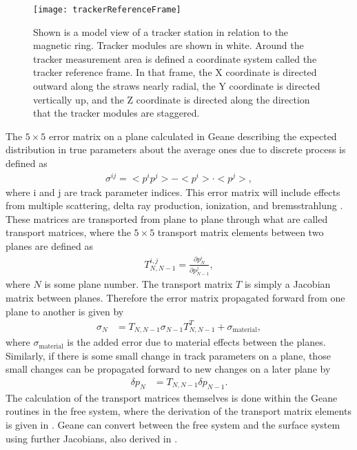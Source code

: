 \begin{figure}[]
  \centering
  \texttt{[image: trackerReferenceFrame]}
    \caption[Tracker reference frame]{Shown is a model view of a tracker station in relation to the magnetic ring. Tracker modules are shown in white. Around the tracker measurement area is defined a coordinate system called the tracker reference frame. In that frame, the X coordinate is directed outward along the straws nearly radial, the Y coordinate is directed vertically up, and the Z coordinate is directed along the direction that the tracker modules are staggered.}
    \label{fig:trackerReferenceFrame}
\end{figure}


The $5 \times 5$ error matrix on a plane calculated in Geane describing the expected distribution in true parameters about the average ones due to discrete process is defined as
    \begin{align} \label{eq:sigma}
        \sigma^{ij} = <p^{i}p^{j}> - <p^{i}> \cdot <p^{j}>,
    \end{align} 
where i and j are track parameter indices. This error matrix will include effects from multiple scattering, delta ray production, ionization, and bremsstrahlung \cite{geanemanual,energyloss}. These matrices are transported from plane to plane through what are called transport matrices, where the $5 \times 5$ transport matrix elements between two planes are defined as 
    \begin{align}
        T_{N,N-1}^{i,j} = \frac{\partial p^{i}_{N}}{\partial p^{j}_{N-1}}, 
    \end{align}
where $N$ is some plane number. The transport matrix $T$ is simply a Jacobian matrix between planes. Therefore the error matrix propagated forward from one plane to another is given by
    \begin{align} \label{eq:transport}
        \sigma_{N} &= T_{N,N-1} \sigma_{N-1} T_{N,N-1}^{T} + \sigma_{\text{material}},
    \end{align}
where $\sigma_{\text{material}}$ is the added error due to material effects between the planes. Similarly, if there is some small change in track parameters on a plane, those small changes can be propagated forward to new changes on a later plane by 
    \begin{align} \label{eq:transport}
        \delta p_{N} &= T_{N,N-1} \delta p_{N-1}.
    \end{align}
The calculation of the transport matrices themselves is done within the Geane routines in the free system, where the derivation of the transport matrix elements is given in . Geane can convert between the free system and the surface system using further Jacobians, also derived in .




